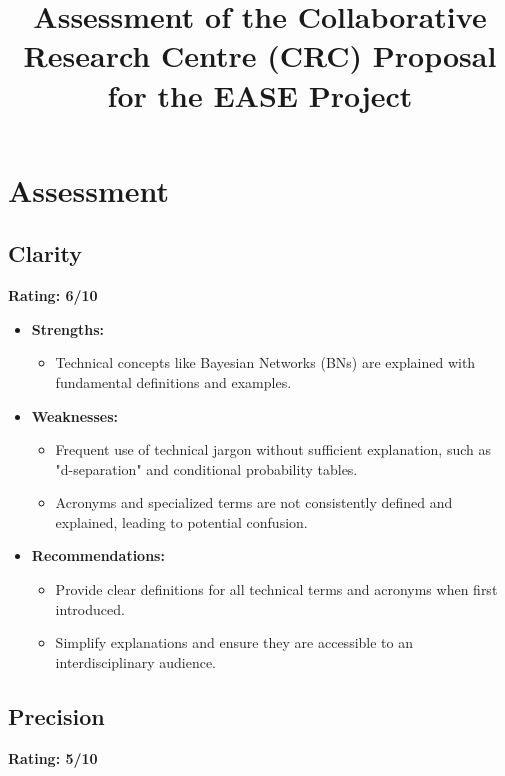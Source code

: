\documentclass{article}
\begin{document}
\title{Assessment of the Collaborative Research Centre (CRC) Proposal for the EASE Project}
\author{}
\date{}
\maketitle

\section{Assessment}

\subsection{Clarity}
\textbf{Rating: 6/10}

\begin{itemize}
    \item \textbf{Strengths:}
    \begin{itemize}
        \item Technical concepts like Bayesian Networks (BNs) are explained with fundamental definitions and examples.
    \end{itemize}
    \item \textbf{Weaknesses:}
    \begin{itemize}
        \item Frequent use of technical jargon without sufficient explanation, such as "d-separation" and conditional probability tables.
        \item Acronyms and specialized terms are not consistently defined and explained, leading to potential confusion.
    \end{itemize}
    \item \textbf{Recommendations:}
    \begin{itemize}
        \item Provide clear definitions for all technical terms and acronyms when first introduced.
        \item Simplify explanations and ensure they are accessible to an interdisciplinary audience.
    \end{itemize}
\end{itemize}

\subsection{Precision}
\textbf{Rating: 5/10}
\end{document}
